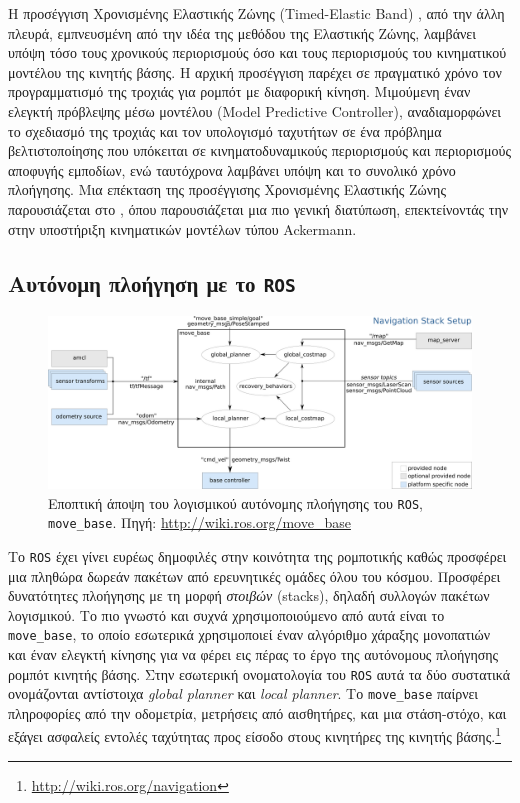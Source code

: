 Η προσέγγιση Χρονισμένης Ελαστικής Ζώνης (Timed-Elastic Band)
\cite{ChristophRoesmann}, από την άλλη πλευρά, εμπνευσμένη από την ιδέα της
μεθόδου της Ελαστικής Ζώνης, λαμβάνει υπόψη τόσο τους χρονικούς περιορισμούς
όσο και τους περιορισμούς του κινηματικού μοντέλου της κινητής βάσης. Η αρχική
προσέγγιση παρέχει σε πραγματικό χρόνο τον προγραμματισμό της τροχιάς για
ρομπότ με διαφορική κίνηση. Μιμούμενη έναν ελεγκτή πρόβλεψης μέσω μοντέλου
(Model Predictive Controller), αναδιαμορφώνει το σχεδιασμό της τροχιάς και τον
υπολογισμό ταχυτήτων σε ένα πρόβλημα βελτιστοποίησης που υπόκειται σε
κινηματοδυναμικούς περιορισμούς και περιορισμούς αποφυγής εμποδίων, ενώ
ταυτόχρονα λαμβάνει υπόψη και το συνολικό χρόνο πλοήγησης. Μια επέκταση της
προσέγγισης Χρονισμένης Ελαστικής Ζώνης παρουσιάζεται στο \cite{Rosmann2017},
όπου παρουσιάζεται μια πιο γενική διατύπωση, επεκτείνοντάς την στην υποστήριξη
κινηματικών μοντέλων τύπου Ackermann.


\subsection{Αυτόνομη πλοήγηση με το \texttt{ROS}}
\label{subsection:02_01_02:03}

\begin{figure}\centering
  \includegraphics[width=\textwidth]{./figures/parts/01/chapters/03/sections/01/move_base.png}
  \caption{\small Εποπτική άποψη του λογισμικού αυτόνομης πλοήγησης του
           \texttt{ROS}, \texttt{move\_base}. Πηγή:
           \url{http://wiki.ros.org/move\_base}}
  \label{fig:movebase}
\end{figure}

Το \texttt{ROS} έχει γίνει ευρέως δημοφιλές στην κοινότητα της ρομποτικής καθώς
προσφέρει μια πληθώρα δωρεάν πακέτων από ερευνητικές ομάδες όλου του κόσμου.
Προσφέρει δυνατότητες πλοήγησης με τη μορφή \textit{στοιβών} (stacks), δηλαδή
συλλογών πακέτων λογισμικού. Το πιο γνωστό και συχνά χρησιμοποιούμενο από αυτά
είναι το \texttt{move\_base}, το οποίο εσωτερικά χρησιμοποιεί έναν
αλγόριθμο χάραξης μονοπατιών και έναν ελεγκτή κίνησης για να φέρει εις πέρας
το έργο της αυτόνομους πλοήγησης ρομπότ κινητής βάσης. Στην εσωτερική
ονοματολογία του \texttt{ROS} αυτά τα δύο συστατικά ονομάζονται αντίστοιχα
\textit{global planner} και \textit{local planner}. Το \texttt{move\_base}
παίρνει πληροφορίες από την οδομετρία, μετρήσεις από αισθητήρες, και μια
στάση-στόχο, και εξάγει ασφαλείς εντολές ταχύτητας προς είσοδο στους κινητήρες
της κινητής βάσης.\footnote{\url{http://wiki.ros.org/navigation}}

